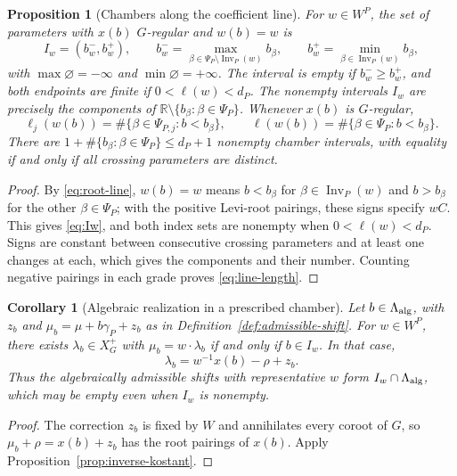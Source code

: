\documentclass[12pt]{amsart}
\numberwithin{equation}{section}
\theoremstyle{plain}
\newtheorem{proposition}[theorem]{Proposition}
\newtheorem{corollary}[theorem]{Corollary}
\theoremstyle{definition}
\theoremstyle{remark}
\DeclareMathOperator{\Inv}{Inv}
\begin{document}
\begin{proposition}[Chambers along the coefficient line]\label{prop:intervals}
For $w\in W^P$, the set of parameters with $x(b)$ $G$-regular and $w(b)=w$ is \begin{equation}\label{eq:Iw}
 I_w=(b_w^-,b_w^+),\qquad
 b_w^-=\max_{\beta\in\Psi_P\setminus\Inv_P(w)}b_\beta,
 \qquad b_w^+=\min_{\beta\in\Inv_P(w)}b_\beta,
\end{equation}
with $\max\varnothing=-\infty$ and $\min\varnothing=+\infty$. The interval is empty if $b_w^-\ge b_w^+$, and both endpoints are finite if $0<\ell(w)<d_P$. The nonempty intervals $I_w$ are precisely the components of $\mathbb R\setminus\{b_\beta:\beta\in\Psi_P\}$.
Whenever $x(b)$ is $G$-regular, 
\begin{equation}\label{eq:line-length}
 \ell_j(w(b))=\#\{\beta\in\Psi_{P,j}:b<b_\beta\},
 \qquad
 \ell(w(b))=\#\{\beta\in\Psi_P:b<b_\beta\}.
\end{equation}
There are $1+\#\{b_\beta:\beta\in\Psi_P\}\le d_P+1$ nonempty chamber intervals, with equality if and only if all crossing parameters are distinct.
\end{proposition}

\begin{proof}
By \eqref{eq:root-line}, $w(b)=w$ means $b<b_\beta$ for $\beta\in\Inv_P(w)$ and $b>b_\beta$ for the other $\beta\in\Psi_P$; with the positive Levi-root pairings, these signs specify $wC$. This gives \eqref{eq:Iw}, and both index sets are nonempty when $0<\ell(w)<d_P$. Signs are constant between consecutive crossing parameters and at least one changes at each, which gives the components and their number. Counting negative pairings in each grade proves \eqref{eq:line-length}.
\end{proof}

\begin{corollary}[Algebraic realization in a prescribed chamber] \label{cor:algebraic-chamber-realizations}
Let $b\in\Lambda_{\rm alg}$, with $z_b$ and $\mu_b=\mu+b\gamma_P+z_b$ as in Definition~\ref{def:admissible-shift}. For $w\in W^P$, there exists $\lambda_b\in X_G^+$ with $\mu_b=w\cdot\lambda_b$ if and only if $b\in I_w$. In that case,
\[
 \lambda_b=w^{-1}x(b)-\rho+z_b.
\]
Thus the algebraically admissible shifts with representative $w$ form $I_w\cap\Lambda_{\rm alg}$, which may be empty even when $I_w$ is nonempty.
\end{corollary}

\begin{proof}
The correction $z_b$ is fixed by $W$ and annihilates every coroot of $G$, so $\mu_b+\rho=x(b)+z_b$ has the root pairings of $x(b)$. Apply Proposition~\ref{prop:inverse-kostant}.
\end{proof}
\end{document}
